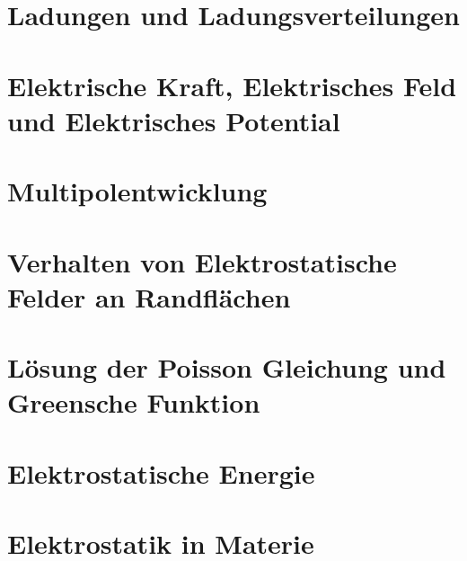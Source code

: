 \section{Ladungen und Ladungsverteilungen}%
\label{sub:Ladungen-und-Ladungsverteilungen}


\newpage
\section{Elektrische Kraft, Elektrisches Feld und Elektrisches Potential}%
\label{sub:Ladungen-und-Ladungsverteilungen}


\newpage
\section{Multipolentwicklung}%
\label{sub:Multipolentwicklung}


\newpage
\section{Verhalten von Elektrostatische Felder an Randflächen}%
\label{sub:randflaechen}


\newpage
\section{Lösung der Poisson Gleichung und Greensche Funktion}%
\label{sub:poisson-green}


\newpage
\section{Elektrostatische Energie}%
\label{sub:elektrostatische-energie}


\newpage
\section{Elektrostatik in Materie}%


